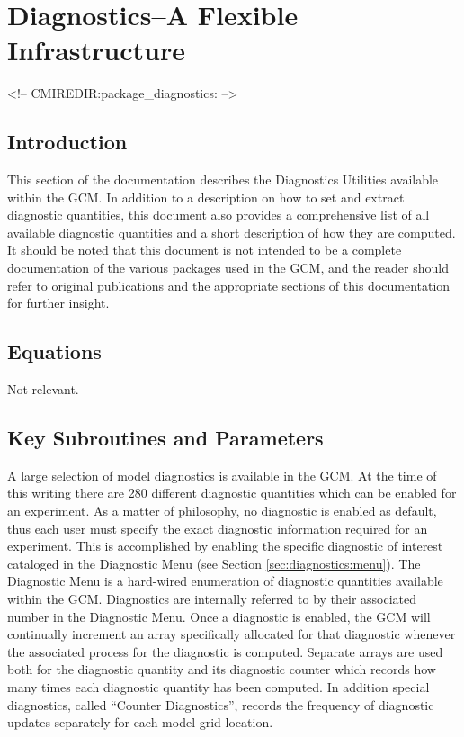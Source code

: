 \section{Diagnostics--A Flexible Infrastructure}
\label{sec:pkg:diagnostics}
\begin{rawhtml}
<!-- CMIREDIR:package_diagnostics: -->
\end{rawhtml}

\subsection{Introduction}

This section of the documentation describes the Diagnostics Utilities available within 
the GCM.  In addition to a description on how to set and extract diagnostic quantities, 
this document also provides a comprehensive list of all available diagnostic quantities 
and a short description of how they are computed.  It should be noted that this document 
is not intended to be a complete documentation of the various packages used in the GCM, 
and the reader should refer to original publications and the appropriate sections of this
documentation for further insight.

\subsection{Equations}
Not relevant.

\subsection{Key Subroutines and Parameters}
\label{sec:diagnostics:diagover}

A large selection of model diagnostics is available in the GCM.  At the time of
this writing there are 280 different diagnostic quantities which can be enabled for an
experiment.  As a matter of philosophy, no diagnostic is enabled as default, thus each user must
specify the exact diagnostic information required for an experiment.  This is accomplished by
enabling the specific diagnostic of interest cataloged in the 
Diagnostic Menu (see Section \ref{sec:diagnostics:menu}).
The Diagnostic Menu is a hard-wired enumeration of diagnostic quantities available within the
GCM.  Diagnostics are internally referred to by their associated number in the Diagnostic
Menu.  Once a diagnostic is enabled, the GCM will continually increment an array
specifically allocated for that diagnostic whenever the associated process for the diagnostic is
computed.  Separate arrays are used both for the diagnostic quantity and its diagnostic counter
which records how many times each diagnostic quantity has been computed.  In addition 
special diagnostics, called
``Counter Diagnostics'', records the frequency of diagnostic updates separately for each 
model grid location.

